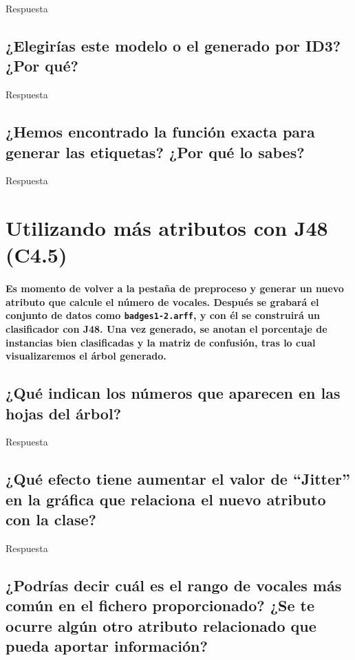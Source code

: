 \documentclass[12pt]{article}
\begin{document}
Respuesta

\subsection{\small ¿Elegirías este modelo o el generado por ID3? ¿Por qué?}

Respuesta

\subsection{\small ¿Hemos encontrado la función exacta para generar las etiquetas?
¿Por qué lo sabes?}

Respuesta

\newpage

\section{Utilizando más atributos con J48 (C4.5)}

\paragraph{\small Es momento de volver a la pestaña de preproceso y generar un
nuevo atributo que calcule el número de vocales. Después se grabará el conjunto
de datos como \texttt{badges1-2.arff}, y con él se construirá un clasificador
con J48. Una vez generado, se anotan el porcentaje de instancias bien
clasificadas y la matriz de confusión, tras lo cual visualizaremos el árbol
generado.}

\subsection{\small ¿Qué indican los números que aparecen en las hojas del árbol?}

Respuesta

\subsection{\small ¿Qué efecto tiene aumentar el valor de ``Jitter'' en la gráfica que
relaciona el nuevo atributo con la clase?}

Respuesta

\subsection{\small ¿Podrías decir cuál es el rango de vocales más común en el fichero
proporcionado? ¿Se te ocurre algún otro atributo relacionado que pueda aportar
información?}
\end{document}
